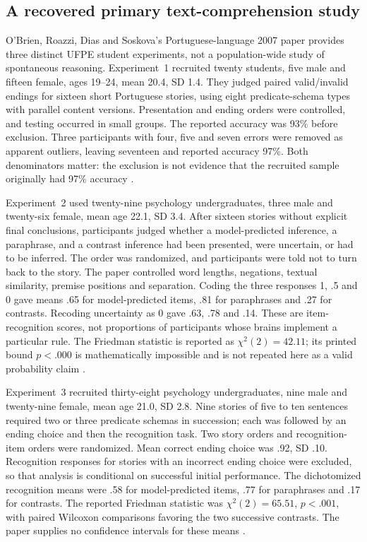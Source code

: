 \subsection{A recovered primary text-comprehension study}

O'Brien, Roazzi, Dias and Soskova's Portuguese-language 2007 paper provides
three distinct UFPE student experiments, not a population-wide study of
spontaneous reasoning. Experiment~1 recruited twenty students, five male
and fifteen female, ages 19--24, mean 20.4, SD 1.4. They judged paired
valid/invalid endings for sixteen short Portuguese stories, using eight
predicate-schema types with parallel content versions. Presentation and
ending orders were controlled, and testing occurred in small groups.
The reported accuracy was 93\% before exclusion. Three participants with
four, five and seven errors were removed as apparent outliers, leaving
seventeen and reported accuracy 97\%. Both denominators matter: the
exclusion is not evidence that the recruited sample originally had 97\%
accuracy \cite[pp.~121--122]{OBrienRoazziDiasSoskova2007Text}.

Experiment~2 used twenty-nine psychology undergraduates, three male and
twenty-six female, mean age 22.1, SD 3.4. After sixteen stories without
explicit final conclusions, participants judged whether a model-predicted
inference, a paraphrase, and a contrast inference had been presented,
were uncertain, or had to be inferred. The order was randomized, and
participants were told not to turn back to the story. The paper controlled
word lengths, negations, textual similarity, premise positions and
separation. Coding the three responses 1, .5 and 0 gave means .65 for
model-predicted items, .81 for paraphrases and .27 for contrasts. Recoding
uncertainty as 0 gave .63, .78 and .14. These are item-recognition scores,
not proportions of participants whose brains implement a particular
rule. The Friedman statistic is reported as \(\chi^2(2)=42.11\);
its printed bound \(p<.000\) is mathematically impossible and is not
repeated here as a valid probability claim
\cite[pp.~122--124]{OBrienRoazziDiasSoskova2007Text}.

Experiment~3 recruited thirty-eight psychology undergraduates, nine male
and twenty-nine female, mean age 21.0, SD 2.8. Nine stories of five to ten
sentences required two or three predicate schemas in succession; each
was followed by an ending choice and then the recognition task. Two
story orders and recognition-item orders were randomized. Mean correct
ending choice was .92, SD .10. Recognition responses for stories with
an incorrect ending choice were excluded, so that analysis is conditional
on successful initial performance. The dichotomized recognition means
were .58 for model-predicted items, .77 for paraphrases and .17 for
contrasts. The reported Friedman statistic was \(\chi^2(2)=65.51\),
\(p<.001\), with paired Wilcoxon comparisons favoring the two successive
contrasts. The paper supplies no confidence intervals for these means
\cite[pp.~124--126]{OBrienRoazziDiasSoskova2007Text}.

